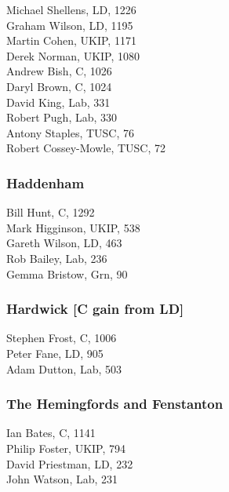 \documentclass[a4paper,openany,10pt]{book}
\begin{document}
Michael Shellens, LD, 1226\\
Graham Wilson, LD, 1195\\
Martin Cohen, UKIP, 1171\\
Derek Norman, UKIP, 1080\\
Andrew Bish, C, 1026\\
Daryl Brown, C, 1024\\
David King, Lab, 331\\
Robert Pugh, Lab, 330\\
Antony Staples, TUSC, 76\\
{Robert Cossey-Mowle}, TUSC, 72\\


\subsubsection*{Haddenham}



Bill Hunt, C, 1292\\
Mark Higginson, UKIP, 538\\
Gareth Wilson, LD, 463\\
Rob Bailey, Lab, 236\\
Gemma Bristow, Grn, 90\\


\subsubsection*{Hardwick \hspace*{\fill}\nolinebreak[1]%
\enspace\hspace*{\fill}
[C gain from LD]}



Stephen Frost, C, 1006\\
Peter Fane, LD, 905\\
Adam Dutton, Lab, 503\\


\subsubsection*{The Hemingfords and Fenstanton}



Ian Bates, C, 1141\\
Philip Foster, UKIP, 794\\
David Priestman, LD, 232\\
John Watson, Lab, 231\\
\end{document}
